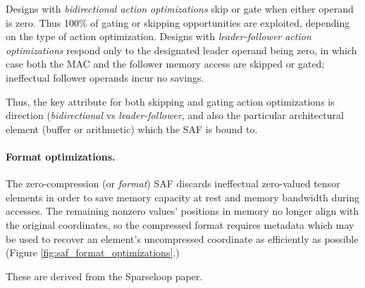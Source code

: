 Designs with \textit{bidirectional action optimizations} skip or gate when either operand is zero. Thus 100\% of gating or skipping opportunities are exploited, depending on the type of action optimization. Designs with \textit{leader-follower action optimizations} respond only to the designated leader operand being zero, in which case both the MAC and the follower memory access are skipped or gated; ineffectual follower operands incur no savings.

Thus, the key attribute for both skipping and gating action optimizations is direction (\textit{bidirectional} vs \textit{leader-follower}, and also the particular architectural element (buffer or arithmetic) which the SAF is bound to.

%
\paragraph{Format optimizations.} The zero-compression (or \textit{format}) SAF discards ineffectual zero-valued tensor elements in order to save memory capacity at rest and memory bandwidth during accesses\cite{sparseloop}. The remaining nonzero values' positions in memory no longer align with the original coordinates, so the compressed format requires metadata which may be used to recover an element's uncompressed coordinate as efficiently as possible (Figure \ref{fig:saf_format_optimizations}.) 

These are derived from the Sparseloop\cite{sparseloop} paper.

%
%
%
%

%
%

